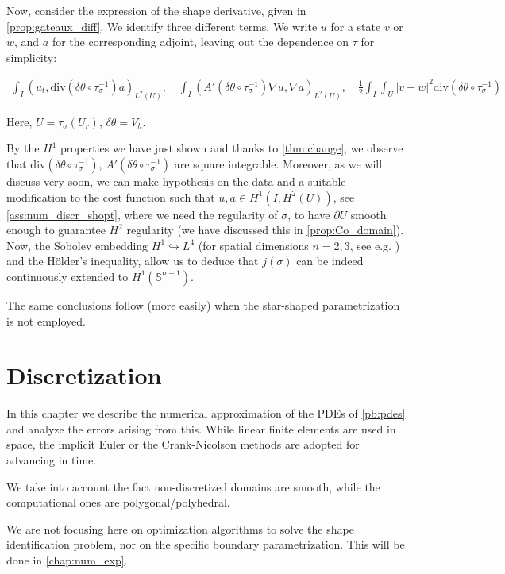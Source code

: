 \documentclass[english,a4paper,10pt,oneside]{scrbook}	%
\theoremstyle{break}
\theoremstyle{remark}
\newcommand{\mS}{\mathbb{S}^{n-1}}
\newcommand{\emb}{\hookrightarrow}
\newcommand{\te}{\theta}
\newcommand{\dive}{\text{div}}
\begin{document}
Now, consider the expression of the shape derivative, given in \cref{prop:gateaux_diff}. We identify three different terms. We write $u$ for a state $v$ or $w$, and $a$ for the corresponding adjoint, leaving out the dependence on $\tau$ for simplicity:

\begin{align*}
\int_I (u_t , \dive(\delta \te \circ \tau_\sigma^{-1}) a)_{L^2(U)}, \quad \int_I (A'(\delta\te\circ \tau_\sigma^{-1} )\nabla u, \nabla a)_{L^2(U)}, \quad \frac{1}{2}\int_I\int_{U} |v-w|^2\dive(\delta \te\circ \tau_\sigma^{-1})
\end{align*}

Here, $U = \tau_\sigma(U_r)$, $\delta \te = V_h$.

By the $H^1$ properties we have just shown and thanks to \cref{thm:change}, we observe that $\dive(\delta \te\circ \tau_\sigma^{-1})$, $A'(\delta\te\circ \tau_\sigma^{-1} )$ are square integrable. Moreover, as we will discuss very soon, we can make hypothesis on the data and a suitable modification to the cost function such that $u, a \in H^1(I, H^2(U))$, see \cref{ass:num_discr_shopt}, where we need the regularity of $\sigma$, to have $\partial U$ smooth enough to guarantee $H^2$ regularity (we have discussed this in \cref{prop:Co_domain}). Now, the Sobolev embedding $H^1\emb L^4$ (for spatial dimensions $n=2,3$, see e.g. \cite{adams}) and the Hölder's inequality, allow us to deduce that $j(\sigma)$ can be indeed continuously extended to $H^1(\mS)$. 

The same conclusions follow (more easily) when the star-shaped parametrization is not employed.


\chapter{Discretization}
\label{chap:discretization}
In this chapter we describe the numerical approximation of the PDEs of \cref{pb:pdes} and analyze the errors arising from this. While linear finite elements are used in space, the implicit Euler or the Crank-Nicolson methods are adopted for advancing in time.

We take into account the fact non-discretized domains are smooth, while the computational ones are polygonal/polyhedral. 

We are not focusing here on optimization algorithms to solve the shape identification problem, nor on the specific boundary parametrization. This will be done in \cref{chap:num_exp}.
\end{document}
